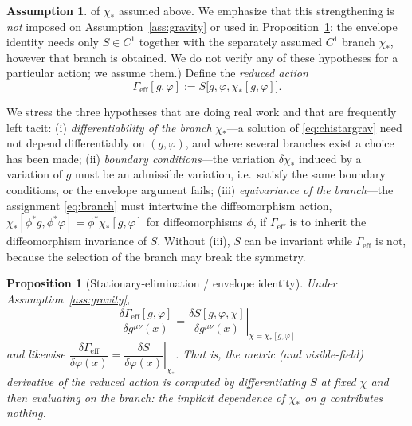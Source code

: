 \documentclass[11pt,reqno]{amsart}
\numberwithin{equation}{section}
\theoremstyle{plain}
\newtheorem{proposition}[theorem]{Proposition}
\theoremstyle{definition}
\newtheorem{assumption}[theorem]{Assumption}
\theoremstyle{remark}
\newcommand{\Geff}{\Gamma_{\mathrm{eff}}}
\begin{document}
\begin{assumption}
of $\chi_{*}$ assumed above. We emphasize that this strengthening is \emph{not} imposed on
Assumption~\ref{ass:gravity} or used in Proposition~\ref{prop:envelope}: the envelope identity
needs only $S\in C^{1}$ together with the separately assumed $C^{1}$ branch $\chi_{*}$, however
that branch is obtained. We do not verify any of these hypotheses for a particular action; we
assume them.)
Define the \emph{reduced action}
\begin{equation}
\label{eq:Geff}
\Geff[g,\varphi]:=S\bigl[g,\varphi,\chi_{*}[g,\varphi]\bigr].
\end{equation}
\end{assumption}

We stress the three hypotheses that are doing real work and that are frequently left tacit:
(i) \emph{differentiability of the branch} $\chi_{*}$---a solution of \eqref{eq:chistargrav}
need not depend differentiably on $(g,\varphi)$, and where several branches exist a choice has
been made; (ii) \emph{boundary conditions}---the variation $\delta\chi_{*}$ induced by a
variation of $g$ must be an admissible variation, i.e.\ satisfy the same boundary conditions,
or the envelope argument fails; (iii) \emph{equivariance of the branch}---the assignment
\eqref{eq:branch} must intertwine the diffeomorphism action, $\chi_{*}[\phi^{*}g,\phi^{*}\varphi]
=\phi^{*}\chi_{*}[g,\varphi]$ for diffeomorphisms $\phi$, if $\Geff$ is to inherit the
diffeomorphism invariance of $S$. Without (iii), $S$ can be invariant while $\Geff$ is not,
because the selection of the branch may break the symmetry.

\begin{proposition}[Stationary-elimination / envelope identity]
\label{prop:envelope}
Under Assumption~\ref{ass:gravity},
\begin{equation}
\label{eq:envelope}
\boxed{\ \
\frac{\delta\Geff[g,\varphi]}{\delta g^{\mu\nu}(x)}
=\left.\frac{\delta S[g,\varphi,\chi]}{\delta g^{\mu\nu}(x)}\right|_{\chi=\chi_{*}[g,\varphi]}
\ \ }
\end{equation}
and likewise
$\dfrac{\delta\Geff}{\delta\varphi(x)}
=\left.\dfrac{\delta S}{\delta\varphi(x)}\right|_{\chi_{*}}$.
That is, the metric (and visible-field) derivative of the reduced action is computed by
differentiating $S$ at fixed $\chi$ and \emph{then} evaluating on the branch: the implicit
dependence of $\chi_{*}$ on $g$ contributes nothing.
\end{proposition}
\end{document}
